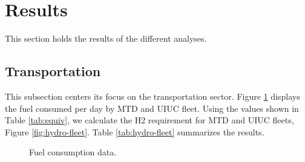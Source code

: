 \section{Results}
\label{sec:Results}

This section holds the results of the different analyses.

\subsection{Transportation}

This subsection centers its focus on the transportation sector.
Figure \ref{fig:fuel} displays the fuel consumed per day by \gls{MTD} and \gls{UIUC} fleet.
Using the values shown in Table \ref{tab:equiv}, we calculate the \gls{H2} requirement for MTD and UIUC fleets, Figure \ref{fig:hydro-fleet}.
Table \ref{tab:hydro-fleet} summarizes the results.

	\begin{figure}[htbp!]
		\centering
		\hfill
		\caption{Fuel consumption data.}
		\label{fig:fuel}
	\end{figure}

